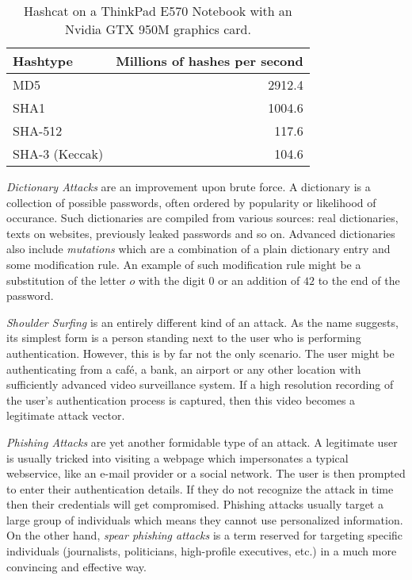 \begin{table}
    \begin{center}
        \begin{tabular}{lr}
            Hashtype & Millions of hashes per second \\
            \hline
            MD5 & 2912.4 \\
            SHA1 & 1004.6 \\
            SHA-512 & 117.6 \\
            SHA-3 (Keccak) & 104.6
          \end{tabular}
      \end{center}
      \caption{Hashcat on a ThinkPad E570 Notebook with an Nvidia GTX 950M graphics card.}
      \label{table:hashcat-speed}
  \end{table}

\emph{Dictionary Attacks} are an improvement upon brute force. A dictionary is a collection of possible passwords, often ordered by popularity or likelihood of occurance. Such dictionaries are compiled from various sources: real dictionaries, texts on websites, previously leaked passwords and so on. Advanced dictionaries also include \emph{mutations} which are a combination of a plain dictionary entry and some modification rule. An example of such modification rule might be a substitution of the letter \(o\) with the digit \(0\) or an addition of \(42\) to the end of the password.

\emph{Shoulder Surfing} is an entirely different kind of an attack. As the name suggests, its simplest form is a person standing next to the user who is performing authentication. However, this is by far not the only scenario. The user might be authenticating from a café, a bank, an airport or any other location with sufficiently advanced video surveillance system. If a high resolution recording of the user's authentication process is captured, then this video becomes a legitimate attack vector.

\emph{Phishing Attacks} are yet another formidable type of an attack. A legitimate user is usually tricked into visiting a webpage which impersonates a typical webservice, like an e-mail provider or a social network. The user is then prompted to enter their authentication details. If they do not recognize the attack in time then their credentials will get compromised. Phishing attacks usually target a large group of individuals which means they cannot use personalized information. On the other hand, \emph{spear phishing attacks} is a term reserved for targeting specific individuals (journalists, politicians, high-profile executives, etc.) in a much more convincing and effective way.

